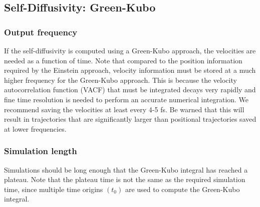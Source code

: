 \documentclass[9pt,bestpractices]{livecoms}
\begin{document}

\subsection{Self-Diffusivity: Green-Kubo} \label{sec:Self-Diffusivity Green-Kubo}


\subsubsection{Output frequency} \label{sec:Self-Diffusivity:Green-Kubo: Output frequency}

If the self-diffusivity is computed using a Green-Kubo approach, the velocities are needed as a function of time. Note that compared to the position information required by the Einstein approach, velocity information must be stored at a much higher frequency for the Green-Kubo approach. This is because the velocity autocorrelation function (VACF) that must be integrated decays very rapidly and fine time resolution is needed to perform an accurate numerical integration.  We recommend saving the velocities at least every 4-5 fs. Be warned that this will result in trajectories that are significantly larger than positional trajectories saved at lower frequencies.

\subsubsection{Simulation length} \label{sec:Self-Diffusivity:Green-Kubo: Simulation length}

Simulations should be long enough that the Green-Kubo integral has reached a plateau. Note that the plateau time is not the same as the required simulation time, since multiple time origins $(t_0)$ are used to compute the Green-Kubo integral.
\end{document}

